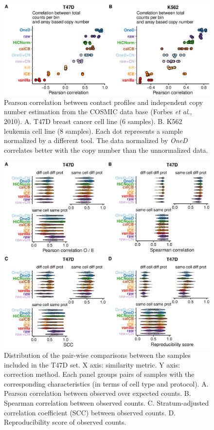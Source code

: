 \documentclass[12pt]{report}
\begin{document}
\begin{figure}[b]
	\centerline{\includegraphics[width=\textwidth]{nar_figures/supp_figure_1.eps}}
  \caption{ Pearson correlation between contact profiles and independent
copy number estimation from the COSMIC data base (Forbes \textit{et al}.,
2010). A. T47D breast cancer cell line (6 samples). B. K562 leukemia cell
line (8 samples). Each dot represents a sample normalized by a different
tool. The data normalized by \textit{OneD} correlates better with the copy
number than the unnormalized data.}
\end{figure}

\begin{figure}
	\centerline{\includegraphics[width=\textwidth]{nar_figures/supp_figure_2.eps}}
  \caption{ Distribution of the pair-wise comparisons between the samples
included in the T47D set. X axis: similarity metric. Y axis: correction
method. Each panel groups pairs of samples with the corresponding
characteristics (in terms of cell type and protocol). A. Pearson
correlation between observed over expected counts. B. Spearman correlation
between observed counts. C. Stratum-adjusted correlation coefficient (SCC)
between observed counts. D. Reproducibility score of observed counts.}
\end{figure}
\end{document}
